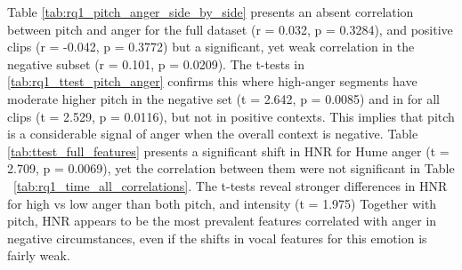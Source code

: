   Table \ref{tab:rq1_pitch_anger_side_by_side} presents an absent correlation between pitch and anger for the full dataset (r = 0.032, p = 0.3284), and positive clips (r = -0.042, p = 0.3772) but a significant, yet weak correlation in the negative subset (r = 0.101, p = 0.0209). 
  The t-tests in \ref{tab:rq1_ttest_pitch_anger} confirms this where high-anger segments have moderate higher pitch in the negative set (t = 2.642, p = 0.0085) and in for all clips (t = 2.529, p = 0.0116), but not in positive contexts. 
  This implies that pitch is a considerable signal of anger when the overall context is negative. Table \ref{tab:ttest_full_features} presents a significant shift in HNR for Hume anger (t = 2.709, p = 0.0069), yet the correlation between them were not significant in Table ~\ref{tab:rq1_time_all_correlations}. 
The t-tests reveal stronger differences in HNR for high vs low anger than both pitch, and intensity (t = 1.975)
Together with pitch, HNR appears to be the most prevalent features correlated with anger in negative circumstances, even if the shifts in vocal features for this emotion is fairly weak. 
  
  
